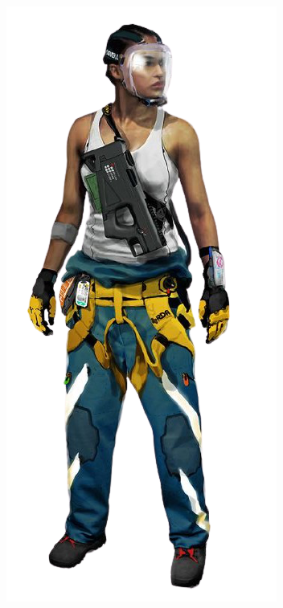\begin{figure}
    \centering
    \includegraphics[width=.55\textwidth]{img/bg/firefighter-4.png}
    \label{fig:refinery}
\end{figure}




\clearpage

